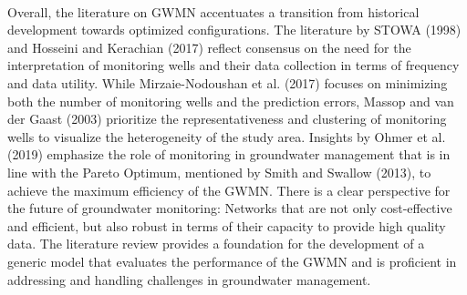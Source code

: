 \\
Overall, the literature on GWMN accentuates a transition from historical development towards optimized configurations. The literature by STOWA (1998) and Hosseini and Kerachian (2017) reflect consensus on the need for the interpretation of monitoring wells and their data collection in terms of frequency and data utility. While Mirzaie-Nodoushan et al. (2017) focuses on minimizing both the number of monitoring wells and the prediction errors, Massop and van der Gaast (2003) prioritize the representativeness and clustering of monitoring wells to visualize the heterogeneity of the study area. Insights by Ohmer et al. (2019) emphasize the role of monitoring in  groundwater management that is in line with the Pareto Optimum, mentioned by Smith and Swallow (2013), to achieve the maximum efficiency of the GWMN. There is a clear perspective for the future of groundwater monitoring: Networks that are not only cost-effective and efficient, but also robust in terms of their capacity to provide high quality data. The literature review provides a foundation for the development of a generic model that evaluates the performance of the GWMN and is proficient in addressing and handling challenges in groundwater management. 
















